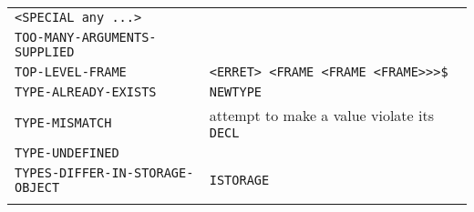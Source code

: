 \documentclass[a4paper,]{article}
\begin{document}
\begin{longtable}[]{@{}ll@{}}
\begin{minipage}[t]{0.36\columnwidth}
\texttt{\textless{}SPECIAL\ any\ ...\textgreater{}}\strut
\end{minipage}\tabularnewline
\begin{minipage}[t]{0.58\columnwidth}\raggedright\strut
\texttt{TOO-MANY-ARGUMENTS-SUPPLIED}\strut
\end{minipage} & \begin{minipage}[t]{0.36\columnwidth}\raggedright\strut
\strut
\end{minipage}\tabularnewline
\begin{minipage}[t]{0.58\columnwidth}\raggedright\strut
\texttt{TOP-LEVEL-FRAME}\strut
\end{minipage} & \begin{minipage}[t]{0.36\columnwidth}\raggedright\strut
\texttt{\textless{}ERRET\textgreater{}\ \textless{}FRAME\ \textless{}FRAME\ \textless{}FRAME\textgreater{}\textgreater{}\textgreater{}\$}\strut
\end{minipage}\tabularnewline
\begin{minipage}[t]{0.58\columnwidth}\raggedright\strut
\texttt{TYPE-ALREADY-EXISTS}\strut
\end{minipage} & \begin{minipage}[t]{0.36\columnwidth}\raggedright\strut
\texttt{NEWTYPE}\strut
\end{minipage}\tabularnewline
\begin{minipage}[t]{0.58\columnwidth}\raggedright\strut
\texttt{TYPE-MISMATCH}\strut
\end{minipage} & \begin{minipage}[t]{0.36\columnwidth}\raggedright\strut
attempt to make a value violate its \texttt{DECL}\strut
\end{minipage}\tabularnewline
\begin{minipage}[t]{0.58\columnwidth}\raggedright\strut
\texttt{TYPE-UNDEFINED}\strut
\end{minipage} & \begin{minipage}[t]{0.36\columnwidth}\raggedright\strut
\strut
\end{minipage}\tabularnewline
\begin{minipage}[t]{0.58\columnwidth}\raggedright\strut
\texttt{TYPES-DIFFER-IN-STORAGE-OBJECT}\strut
\end{minipage} & \begin{minipage}[t]{0.36\columnwidth}\raggedright\strut
\texttt{ISTORAGE}\strut
\end{minipage}\tabularnewline
\begin{minipage}[t]{0.58\columnwidth}\raggedright\strut

\end{minipage}
\end{longtable}
\end{document}
